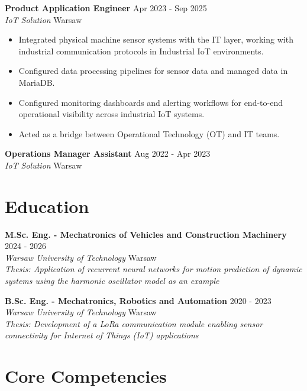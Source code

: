 \documentclass[11pt,a4paper]{article}
\newcommand{\entry}[4]{%
	\noindent\textbf{\color{darktext}#1} \hfill {\small #2} \\
	\textit{#3} \hfill {\small #4}%
}
\begin{document}
	\vspace{0.3em}
	
	\entry{Product Application Engineer}{Apr 2023 - Sep 2025}{IoT Solution}{Warsaw}
	\begin{itemize}[leftmargin=1.5em, itemsep=0.1em, topsep=0.2em]
		\item Integrated physical machine sensor systems with the IT layer, working with industrial communication protocols in Industrial IoT environments.
		\item Configured data processing pipelines for sensor data and managed data in MariaDB.
		\item Configured monitoring dashboards and alerting workflows for end-to-end operational visibility across industrial IoT systems.
		\item Acted as a bridge between Operational Technology (OT) and IT teams.
	\end{itemize}
	
	\vspace{0.3em}
	
	\entry{Operations Manager Assistant}{Aug 2022 - Apr 2023}{IoT Solution}{Warsaw}
	
	\section{Education}
	
	\entry{M.Sc. Eng. - Mechatronics of Vehicles and Construction Machinery}{2024 - 2026}{Warsaw University of Technology}{Warsaw}\\
	{\small\textit{Thesis: Application of recurrent neural networks for motion prediction of dynamic systems using the harmonic oscillator model as an example}}
	
	\vspace{0.3em}
	
	\entry{B.Sc. Eng. - Mechatronics, Robotics and Automation}{2020 - 2023}{Warsaw University of Technology}{Warsaw}\\
	{\small\textit{Thesis: Development of a LoRa communication module enabling sensor connectivity for Internet of Things (IoT) applications}}
	
	\section{Core Competencies}
	
\end{document}
